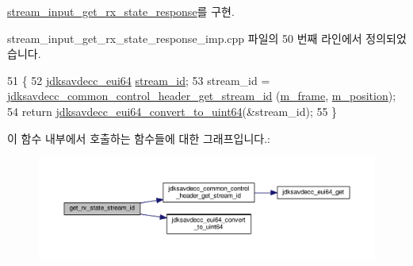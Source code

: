 \hyperlink{classavdecc__lib_1_1stream__input__get__rx__state__response_aa778838fbcebe5544f9914a8e58a4d59}{stream\+\_\+input\+\_\+get\+\_\+rx\+\_\+state\+\_\+response}를 구현.



stream\+\_\+input\+\_\+get\+\_\+rx\+\_\+state\+\_\+response\+\_\+imp.\+cpp 파일의 50 번째 라인에서 정의되었습니다.


\begin{DoxyCode}
51 \{
52     \hyperlink{structjdksavdecc__eui64}{jdksavdecc\_eui64} \hyperlink{avtp_8h_af5af7b461263e29ceb91a8d3a8bc2c97}{stream\_id};
53     stream\_id = \hyperlink{group__jdksavdecc__avtp__common__control__header_ga99181000ee374936c8518f657fa9f5cd}{jdksavdecc\_common\_control\_header\_get\_stream\_id}
      (\hyperlink{classavdecc__lib_1_1stream__input__get__rx__state__response__imp_a50417969cf438e7c8d698726bbbe2ff9}{m\_frame}, \hyperlink{classavdecc__lib_1_1stream__input__get__rx__state__response__imp_af5e691c4a8a0feb07f48440b321206cd}{m\_position});
54     \textcolor{keywordflow}{return} \hyperlink{group__eui64_ga1c9a3634faa4bec90dea5a52e691bf63}{jdksavdecc\_eui64\_convert\_to\_uint64}(&stream\_id);
55 \}
\end{DoxyCode}


이 함수 내부에서 호출하는 함수들에 대한 그래프입니다.\+:
\nopagebreak
\begin{figure}[H]
\begin{center}
\leavevmode
\includegraphics[width=350pt]{classavdecc__lib_1_1stream__input__get__rx__state__response__imp_a69d029e252d76bb91c96e8f972f3c2d3_cgraph}
\end{center}
\end{figure}


